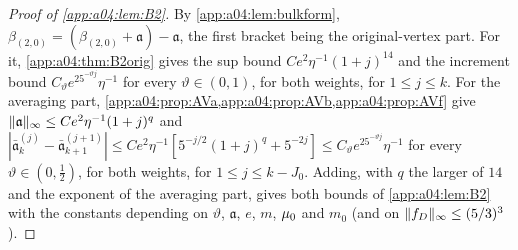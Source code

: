 \begin{proof}[Proof of \cref{app:a04:lem:B2}]
By \cref{app:a04:lem:bulkform}, $\beta_{(2,0)}=(\beta_{(2,0)}+\mathfrak a)-\mathfrak a$, the first bracket being the original-vertex part. For it, \cref{app:a04:thm:B2orig} gives the sup bound $Ce^2\eta^{-1}(1+j)^{14}$ and the increment bound $C_\vartheta e^25^{-\vartheta j}\eta^{-1}$ for every $\vartheta\in(0,1)$, for both weights, for $1\le j\le k$. For the averaging part, \cref{app:a04:prop:AVa,app:a04:prop:AVb,app:a04:prop:AVf} give $\lVert \mathfrak a\rVert_\infty\le Ce^2\eta^{-1}(1+j)^q$ and $|\bar{\mathfrak a}^{(j)}_k-\bar{\mathfrak a}^{(j+1)}_{k+1}|\le Ce^2\eta^{-1}[5^{-j/2}(1+j)^q+5^{-2j}]\le C_\vartheta e^25^{-\vartheta j}\eta^{-1}$ for every $\vartheta\in(0,\frac12)$, for both weights, for $1\le j\le k-J_0$. Adding, with $q$ the larger of $14$ and the exponent of the averaging part, gives both bounds of \cref{app:a04:lem:B2} with the constants depending on $\vartheta$, $\mathfrak a$, $e$, $m$, $\mu_0$ and $m_0$ (and on $\lVert f_D\rVert_\infty\le(5/3)^3$).
\end{proof}
